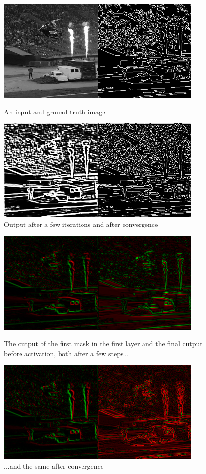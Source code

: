 \documentclass[12pt]{report}
\begin{document}
\begin{figure}
	\centering
	\includegraphics{images/out1.png}
	\caption{An input and ground truth image}
	\includegraphics{images/out2.png}
	\caption{Output after a few iterations and after convergence}
\end{figure}
\begin{figure}
	\centering
	\includegraphics{images/layer1.png}
	\caption{The output of the first mask in the first layer and the final output before activation, both after a few steps...}
	\includegraphics{images/layer2.png}
	\caption{...and the same after convergence}
\end{figure}
\end{document}

